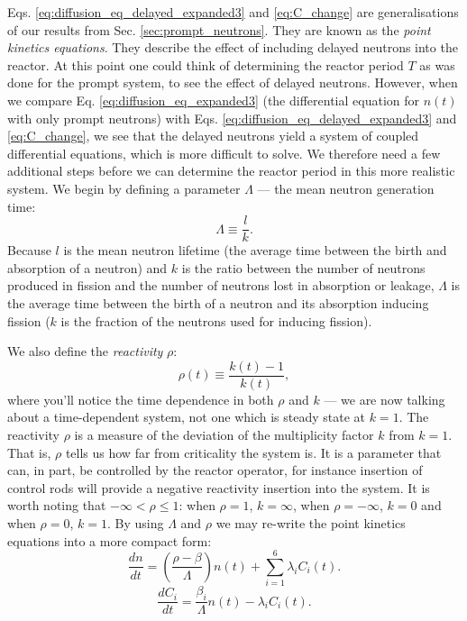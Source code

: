 Eqs. \ref{eq:diffusion_eq_delayed_expanded3} and \ref{eq:C_change} are generalisations of our results from Sec. \ref{sec:prompt_neutrons}. They are known as the \emph{point kinetics equations}. They describe the effect of including delayed neutrons into the reactor. At this point one could think of determining the reactor period $T$ as was done for the prompt system, to see the effect of delayed neutrons. However, when we compare Eq. \ref{eq:diffusion_eq_expanded3} (the differential equation for $n(t)$ with only prompt neutrons) with Eqs. \ref{eq:diffusion_eq_delayed_expanded3} and \ref{eq:C_change}, we see that the delayed neutrons yield a system of coupled differential equations, which is more difficult to solve. We therefore need a few additional steps before we can determine the reactor period in this more realistic system. We begin by defining a parameter $\Lambda$ --- the mean neutron generation time:
\begin{equation}
	\Lambda \equiv \frac{l}{k}.
	\label{eq:Lambda_def}
\end{equation}
Because $l$ is the mean neutron lifetime (the average time between the birth and absorption of a neutron) and $k$ is the ratio between the number of neutrons produced in fission and the number of neutrons lost in absorption or leakage, $\Lambda$ is the average time between the birth of a neutron and its absorption inducing fission ($k$ is the fraction of the neutrons used for inducing fission).

We also define the \emph{reactivity} $\rho$:
\begin{equation}
	\rho(t) \equiv \frac{k(t) - 1}{k(t)},
	\label{eq:rho_def}
\end{equation}
where you'll notice the time dependence in both $\rho$ and $k$ --- we are now talking about a time-dependent system, not one which is steady state at $k = 1$. The reactivity $\rho$ is a measure of the deviation of the multiplicity factor $k$ from $k = 1$. That is, $\rho$ tells us how far from criticality the system is. It is a parameter that can, in part, be controlled by the reactor operator, for instance insertion of control rods will provide a negative reactivity insertion into the system. It is worth noting that $-\infty < \rho \leq 1$: when $\rho = 1$, $k = \infty$, when $\rho = -\infty$, $k = 0$ and when $\rho = 0$, $k = 1$. By using $\Lambda$ and $\rho$ we may re-write the point kinetics equations into a more compact form:
\begin{equation}
	\frac{dn}{dt} = \left( \frac{\rho - \beta}{\Lambda} \right) n(t) + \sum_{i=1}^6 \lambda_i C_i(t).
	\label{eq:point_kinetics1}
\end{equation}
\begin{equation}
	\frac{d C_i}{d t} = \frac{\beta_i}{\Lambda} n(t) - \lambda_i C_i(t).
	\label{eq:point_kinetics2}
\end{equation}

